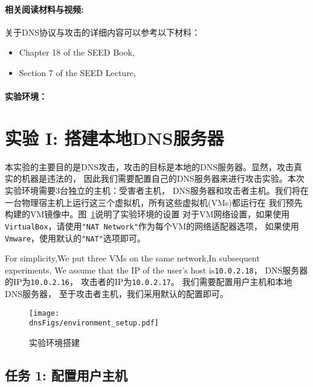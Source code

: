 \paragraph{相关阅读材料与视频:}
关于DNS协议与攻击的详细内容可以参考以下材料：

\begin{itemize}
\item Chapter 18 of the SEED Book, \seedbook
\item Section 7 of the SEED Lecture, \seedisvideo
\end{itemize}



\paragraph{实验环境：} \seedenvironment



\section{实验 I: 搭建本地DNS服务器}

本实验的主要目的是DNS攻击，攻击的目标是本地的DNS服务器。显然，攻击真实的机器是违法的，
因此我们需要配置自己的DNS服务器来进行攻击实验。本次实验环境需要3台独立的主机：受害者主机，
DNS服务器和攻击者主机。我们将在一台物理宿主机上运行这三个虚拟机，所有这些虚拟机(VMs)都运行在
我们预先构建的\ubuntu VM镜像中。图~\ref{dns:fig:environment}说明了实验环境的设置
对于VM网络设置，如果使用{\tt VirtualBox}，请使用{\tt "NAT Network"}作为每个VM的网络适配器选项，
如果使用{\tt Vmware}，使用默认的{\tt "NAT"}选项即可。

For simplicity,We put three VMs on the same network,In subsequent experiments,
We assume that the IP of the user's host is{\tt 10.0.2.18}，
DNS服务器的IP为{\tt 10.0.2.16}，
攻击者的IP为{\tt 10.0.2.17}。
我们需要配置用户主机和本地DNS服务器，
至于攻击者主机，我们采用默认的配置即可。


\begin{figure}[htb]
\centering
\texttt{[image: \\dnsFigs/environment\_setup.pdf]}
\caption{实验环境搭建}
\label{dns:fig:environment}
\end{figure}


\subsection{任务 1: 配置用户主机}

